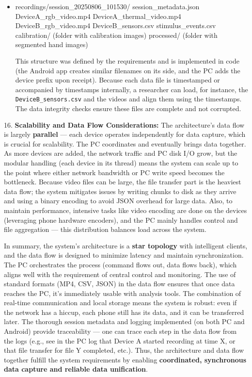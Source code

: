 \documentclass[11pt,a4paper]{report}
\begin{document}
\begin{itemize}
\item recordings/session\_20250806\_101530/
        session\_metadata.json
        DeviceA\_rgb\_video.mp4
        DeviceA\_thermal\_video.mp4
        DeviceB\_rgb\_video.mp4
        DeviceB\_sensors.csv
        stimulus\_events.csv
        calibration/ (folder with calibration images)
        processed/ (folder with segmented hand images)

  This structure was defined by the requirements and is implemented in
  code (the Android app creates similar filenames on its
  side,
  and the PC adds the device prefix upon receipt). Because each data
  file is timestamped or accompanied by timestamps internally, a
  researcher can load, for instance, the \texttt{DeviceB\_sensors.csv} and the
  videos and align them using the timestamps. The data integrity checks
  ensure these files are complete and not corrupted.

\end{itemize}
16. \textbf{Scalability and Data Flow Considerations:} The architecture's
    data flow is largely \textbf{parallel} --- each device operates
    independently for data capture, which is crucial for scalability.
    The PC coordinates and eventually brings data together. As more
    devices are added, the network traffic and PC disk I/O grow, but the
    modular handling (each device in its thread) means the system can
    scale up to the point where either network bandwidth or PC write
    speed becomes the bottleneck. Because video files can be large, the
    file transfer part is the heaviest data flow; the system mitigates
    issues by writing chunks to disk as they arrive and using a binary
    encoding to avoid JSON overhead for large
    data.
    Also, to maintain performance, intensive tasks like video encoding
    are done on the devices (leveraging phone hardware encoders), and
    the PC mainly handles control and file aggregation --- this
    distribution balances load across the system.

In summary, the system's architecture is a \textbf{star topology} with
intelligent clients, and the data flow is designed to minimize latency
and maintain synchronization. The PC orchestrates the process (command
flows out, data flows back), which aligns well with the requirement of
central control and monitoring. The use of standard formats (MP4, CSV,
JSON) in the data flow ensures that once data reaches the PC, it's
immediately usable with analysis tools. The combination of real-time
communication and local storage means the system is robust: even if the
network has a hiccup, each phone still has its data, and it can be
transferred later. The thorough session metadata and logging implemented
(on both PC and Android) provide traceability --- one can trace each step
in the data flow from the logs (e.g., see in the PC log that Device A
started recording at time X, or that file transfer for file Y completed,
etc.). Thus, the architecture and data flow together fulfill the system
requirements by enabling \textbf{coordinated, synchronous data capture and
reliable data unification}.
\end{document}
